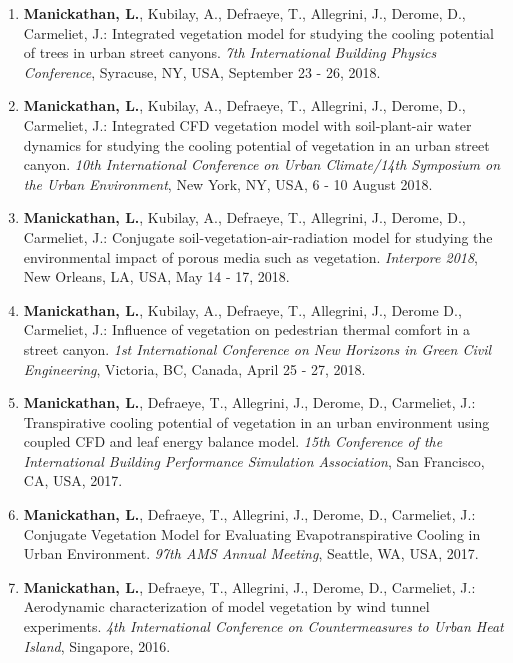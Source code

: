 \begin{enumerate}
	\item \textbf{Manickathan, L.}, Kubilay, A., Defraeye, T., Allegrini, J., Derome, D., Carmeliet, J.: Integrated vegetation model for studying the cooling potential of trees in urban street canyons. \textit{7th International Building Physics Conference}, Syracuse, NY, USA, September 23 - 26, 2018.
	
	\item \textbf{Manickathan, L.}, Kubilay, A., Defraeye, T., Allegrini, J., Derome, D., Carmeliet, J.: Integrated CFD vegetation model with soil-plant-air water dynamics for studying the cooling potential of vegetation in an urban street canyon. \textit{10th International Conference on Urban Climate/14th Symposium on the Urban Environment}, New York, NY, USA, 6 - 10 August 2018.
	
	\item \textbf{Manickathan, L.}, Kubilay, A., Defraeye, T., Allegrini, J., Derome, D., Carmeliet, J.: Conjugate soil-vegetation-air-radiation model for studying the environmental impact of porous media such as vegetation. \textit{Interpore 2018}, New Orleans, LA, USA, May 14 - 17, 2018.
	
	\item \textbf{Manickathan, L.}, Kubilay, A., Defraeye, T., Allegrini, J., Derome D., Carmeliet, J.: Influence of vegetation on pedestrian thermal comfort in a street canyon. \textit{1st International Conference on New Horizons in Green Civil Engineering}, Victoria, BC, Canada, April 25 - 27, 2018.
	
	\item \textbf{Manickathan, L.}, Defraeye, T., Allegrini, J., Derome, D., Carmeliet, J.: Transpirative cooling potential of vegetation in an urban environment using coupled CFD and leaf energy balance model. \textit{15th Conference of the International Building Performance Simulation Association}, San Francisco, CA, USA, 2017.
	
	\item \textbf{Manickathan, L.}, Defraeye, T., Allegrini, J., Derome, D., Carmeliet, J.: Conjugate Vegetation Model for Evaluating Evapotranspirative Cooling in Urban Environment. \textit{97th AMS Annual Meeting}, Seattle, WA, USA, 2017.
	
	\item \textbf{Manickathan, L.}, Defraeye, T., Allegrini, J., Derome, D., Carmeliet, J.: Aerodynamic characterization of model vegetation by wind tunnel experiments. \textit{4th International Conference on Countermeasures to Urban Heat Island}, Singapore, 2016.
	
\end{enumerate}